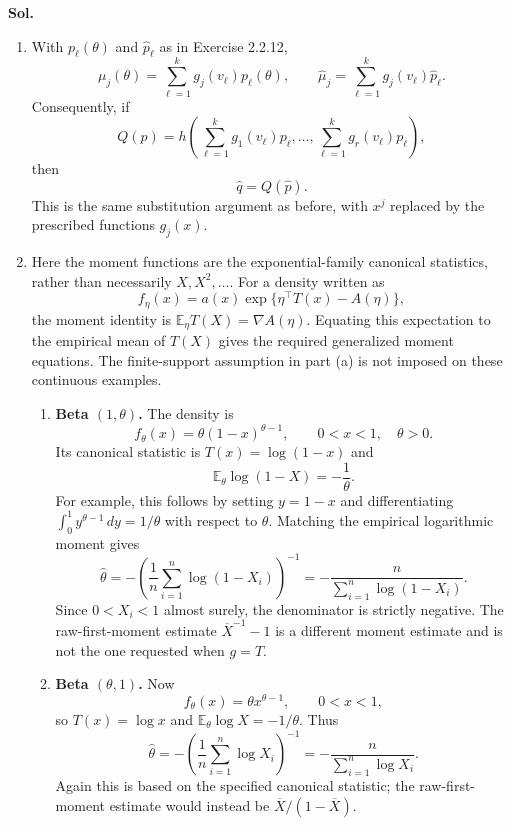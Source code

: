 \documentclass[lang=en,11pt,a4paper,citestyle=authoryear]{elegantpaper}
\newcommand{\E}{\mathbb{E}}
\begin{document}
\par\vspace{0.5em}\noindent\textbf{Sol.}
\begin{enumerate}[label=(\alph*),leftmargin=*]
\item With $p_\ell(\theta)$ and $\widehat p_\ell$ as in Exercise 2.2.12,
\[
\mu_j(\theta)=\sum_{\ell=1}^k g_j(v_\ell)p_\ell(\theta),
\qquad
\widehat\mu_j=\sum_{\ell=1}^k g_j(v_\ell)\widehat p_\ell.
\]
Consequently, if
\[
Q(p)=h\left(\sum_{\ell=1}^k g_1(v_\ell)p_\ell,\ldots,
\sum_{\ell=1}^k g_r(v_\ell)p_\ell\right),
\]
then
\[
{\widehat q=Q(\widehat p).}
\]
This is the same substitution argument as before, with $x^j$
replaced by the prescribed functions $g_j(x)$.

\item Here the moment functions are the exponential-family canonical
statistics, rather than necessarily $X,X^2,\ldots$.
For a density written as
\[
f_\eta(x)=a(x)\exp\{\eta^\top T(x)-A(\eta)\},
\]
the moment identity is $\E_\eta T(X)=\nabla A(\eta)$.
Equating this expectation to the empirical mean of $T(X)$ gives the
required generalized moment equations. The finite-support assumption
in part (a) is not imposed on these continuous examples.

\begin{enumerate}[label=(\roman*),leftmargin=*]
\item \textbf{Beta $(1,\theta)$.}
The density is
\[
f_\theta(x)=\theta(1-x)^{\theta-1},\qquad0<x<1,\quad\theta>0.
\]
Its canonical statistic is $T(x)=\log(1-x)$ and
\[
\E_\theta\log(1-X)=-\frac1\theta.
\]
For example, this follows by setting $y=1-x$ and differentiating
$\int_0^1y^{\theta-1}\,dy=1/\theta$ with respect to $\theta$.
Matching the empirical logarithmic moment gives
\[
{\widehat\theta
=-\left(\frac1n\sum_{i=1}^n\log(1-X_i)\right)^{-1}
=-\frac{n}{\sum_{i=1}^n\log(1-X_i)}.}
\]
Since $0<X_i<1$ almost surely, the denominator is strictly negative.
The raw-first-moment estimate $\overline X^{-1}-1$ is a different
moment estimate and is not the one requested when $g=T$.

\item \textbf{Beta $(\theta,1)$.}
Now
\[
f_\theta(x)=\theta x^{\theta-1},\qquad0<x<1,
\]
so $T(x)=\log x$ and $\E_\theta\log X=-1/\theta$.
Thus
\[
{\widehat\theta
=-\left(\frac1n\sum_{i=1}^n\log X_i\right)^{-1}
=-\frac{n}{\sum_{i=1}^n\log X_i}.}
\]
Again this is based on the specified canonical statistic;
the raw-first-moment estimate would instead be
$\overline X/(1-\overline X)$.


\end{enumerate}
\end{enumerate}
\end{document}
